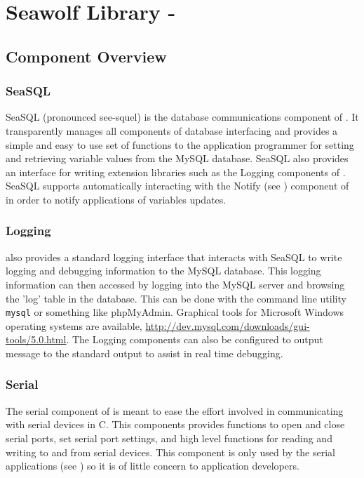 
\newpage
\section{Seawolf Library - \libseawolf{}} \label{libseawolf}
\subsection{Component Overview} \label{libseawolfcomponents}
\subsubsection{SeaSQL} \label{overviewseasql}
SeaSQL (pronounced see-squel) is the database communications component of
\libseawolf. It transparently manages all components of database interfacing and
provides a simple and easy to use set of functions to the application programmer
for setting and retrieving variable values from the MySQL database. SeaSQL also
provides an interface for writing extension libraries such as the Logging
components of \libseawolf{}. SeaSQL supports automatically interacting with the
Notify (see ) component of \libseawolf{} in
order to notify applications of variables updates.

\subsubsection{Logging} \label{overviewlogging}
\libseawolf{} also provides a standard logging interface that interacts with
SeaSQL to write logging and debugging information to the MySQL database. This
logging information can then accessed by logging into the MySQL server and
browsing the 'log' table in the database. This can be done with the command line
utility \texttt{mysql} or something like phpMyAdmin. Graphical tools for
Microsoft Windows operating systems are available,
\url{http://dev.mysql.com/downloads/gui-tools/5.0.html}. The Logging components
can also be configured to output message to the standard output to assist in
real time debugging.

\subsubsection{Serial} \label{overviewserial}
The serial component of \libseawolf{} is meant to ease the effort involved in
communicating with serial devices in C. This components provides functions to
open and close serial ports, set serial port settings, and high level functions
for reading and writing to and from serial devices. This component is only used
by the serial applications (see ) so it
is of little concern to application developers.

